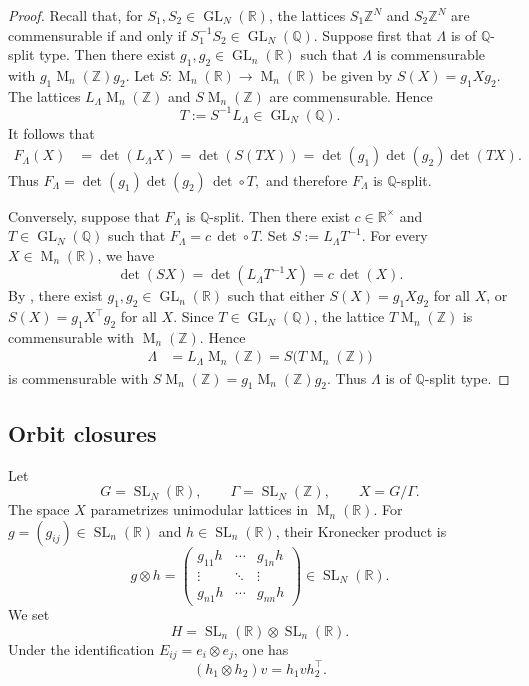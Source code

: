 \documentclass[reqno,11pt]{amsart}
\numberwithin{equation}{section}
\theoremstyle{definition}
\theoremstyle{remark}
\newcommand{\op}{\operatorname}
\newcommand{\M}{\op{M}}
\newcommand{\GL}{\op{GL}}
\newcommand{\SL}{\op{SL}}
\begin{document}
\begin{proof}
Recall that, for $S_1,S_2\in\GL_N(\mathbb R)$, the lattices
$S_1\mathbb Z^N$ and $S_2\mathbb Z^N$ are commensurable if and only if $S_1^{-1}S_2\in\GL_N(\mathbb Q)$.
Suppose first that $\Lambda$ is of $\mathbb Q$-split type. Then there
exist $g_1,g_2\in\GL_n(\mathbb R)$ such that $\Lambda$ is
commensurable with $g_1\M_n(\mathbb Z)g_2$.
Let
$
S:\M_n(\mathbb R)\to\M_n(\mathbb R)$ be given by $S(X)=g_1Xg_2$.
The lattices $L_\Lambda\M_n(\mathbb Z)$ and
$S\M_n(\mathbb Z)$ are commensurable. Hence
$$
T:=S^{-1}L_\Lambda\in\GL_N(\mathbb Q).
$$
It follows that
$$
\begin{aligned}
F_\Lambda(X)
&=\det(L_\Lambda X)=\det(S(TX))=\det(g_1)\det(g_2)\det(TX).
\end{aligned}
$$
Thus
$F_\Lambda=
\det(g_1)\det(g_2)\,\det\circ T,
$
and therefore $F_\Lambda$ is $\mathbb Q$-split.

Conversely, suppose that $F_\Lambda$ is $\mathbb Q$-split. Then there
exist $c\in\mathbb R^\times$ and $T\in\GL_N(\mathbb Q)$ such that $ F_\Lambda=c\,\det\circ T$. Set $S:=L_\Lambda T^{-1}$. For every $X\in\M_n(\mathbb R)$, we have
$$
\det(SX)
=
\det(L_\Lambda T^{-1}X)
=
c\,\det(X).
$$
By , there exist $g_1,g_2\in\GL_n(\mathbb R)$ such that either $S(X)=g_1Xg_2$
for all $X$, or
$
S(X)=g_1X^{\intercal}g_2$
for all $X$. Since $T\in\GL_N(\mathbb Q)$, the lattice
$T\M_n(\mathbb Z)$ is commensurable with $\M_n(\mathbb Z)$. Hence
$$
\begin{aligned}
\Lambda
&=L_\Lambda\M_n(\mathbb Z) =S\bigl(T\M_n(\mathbb Z)\bigr)
\end{aligned}
$$
is commensurable with $S\M_n(\mathbb Z)=g_1\M_n(\mathbb Z)g_2$.
Thus $\Lambda$ is of $\mathbb Q$-split type.

\end{proof}




\subsection{Orbit closures}

Let
$$
    G=\SL_N(\mathbb R),
    \qquad
    \Gamma=\SL_N(\mathbb Z),
    \qquad
    X=G/\Gamma.
$$
The space $X$ parametrizes unimodular lattices in $\M_n(\mathbb R)$.
For $g=(g_{ij})\in\SL_n(\mathbb R)$ and $h\in\SL_n(\mathbb R)$, their
Kronecker product is
$$
    g\otimes h
    =
    \begin{pmatrix}
    g_{11}h&\cdots&g_{1n}h\\
    \vdots&\ddots&\vdots\\
    g_{n1}h&\cdots&g_{nn}h
    \end{pmatrix}
    \in\SL_N(\mathbb R).
$$
We set
$$
    H=\SL_n(\mathbb R)\otimes\SL_n(\mathbb R).
$$
Under the identification $E_{ij}=e_i\otimes e_j$, one has
$$
    (h_1\otimes h_2)v=h_1vh_2^{\intercal}.
$$
\end{document}

